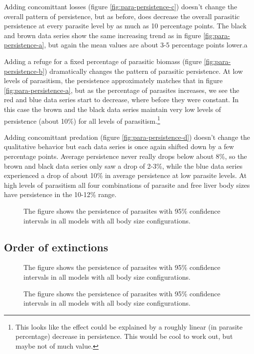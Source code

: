 \documentclass[11pt]{amsart}
\begin{document}
Adding concomittant losses (figure \ref{fig:para-persistence-c}) doesn't change the overall pattern of persistence, but as before, does decrease the overall parasitic persistence at every parasite level by as much as 10 percentage points.  The black and brown data series show the same increasing trend as in figure \ref{fig:para-persistence-a}, but again the mean values are about 3-5 percentage points lower.a

Adding a refuge for a fixed percentage of parasitic biomass (figure \ref{fig:para-persistence-b}) dramatically changes the pattern of parasitic persistence.  At low levels of parasitism, the persistence approximately matches that in figure \ref{fig:para-persistence-a}, but as the percentage of parasites increases, we see the red and blue data series start to decrease, where before they were constant.  In this case the brown and the black data series maintain very low levels of persistence (about 10\%) for all levels of parasitism.\footnote{This looks like the effect could be explained by a roughly linear (in parasite percentage) decrease in persistence.  This would be cool to work out, but maybe not of much value.}

  Adding concomittant predation (figure \ref{fig:para-persistence-d}) doesn't change the qualitative behavior but each data series is once again shifted down by a few percentage points.  Average persistence never really drops below about 8\%, so the brown and black data series only saw a drop of 2-3\%, while the blue data series experienced a drop of about 10\% in average persistence at low parasite levels.  At high levels of parasitism all four combinations of parasite and free liver body sizes have persistence in the 10-12\% range.

\begin{figure}[h]
\caption{The figure shows the persistence of parasites with 95\% confidence intervals in all models with all body size configurations.}
\label{fig:persistencePara}
\end{figure}


\subsection{Order of extinctions}

\begin{figure}[h]
\caption{The figure shows the persistence of parasites with 95\% confidence intervals in all models with all body size configurations.}
\label{fig:persistencePara}
\end{figure}
\begin{figure}[h]
\caption{The figure shows the persistence of parasites with 95\% confidence intervals in all models with all body size configurations.}
\label{fig:persistencePara}
\end{figure}
\end{document}
